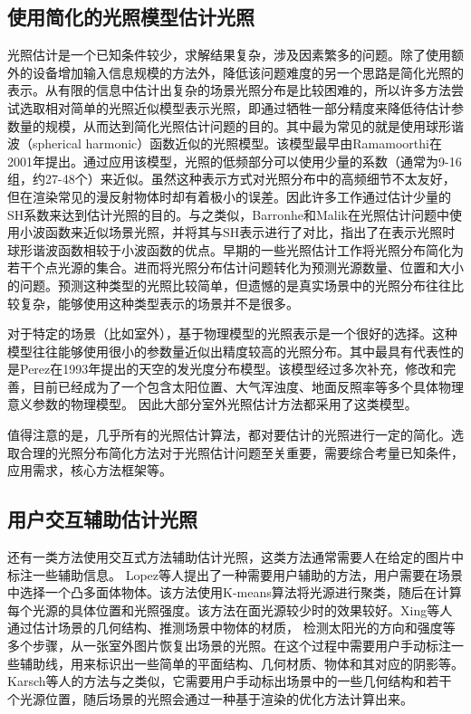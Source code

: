 \subsection{使用简化的光照模型估计光照}
光照估计是一个已知条件较少，求解结果复杂，涉及因素繁多的问题。除了使用额外的设备增加输入信息规模的方法外，降低该问题难度的另一个思路是简化光照的表示。从有限的信息中估计出复杂的场景光照分布是比较困难的，所以许多方法尝试选取相对简单的光照近似模型表示光照，即通过牺牲一部分精度来降低待估计参数量的规模，从而达到简化光照估计问题的目的。其中最为常见的就是使用球形谐波（spherical harmonic）函数近似的光照模型。该模型最早由Ramamoorthi\cite{ramamoorthi2001efficient}在2001年提出。通过应用该模型，光照的低频部分可以使用少量的系数（通常为9-16组，约27-48个）来近似。虽然这种表示方式对光照分布中的高频细节不太友好，但在渲染常见的漫反射物体时却有着极小的误差。因此许多工作\cite{ramamoorthi2001signal,kemelmacher20113d,garrido2013reconstructing,knorr2014real,li2014intrinsic,barron2015shape, rematas2016deep}通过估计少量的SH系数来达到估计光照的目的。与之类似，Barronhe和Malik\cite{okabe2004spherical}在光照估计问题中使用小波函数来近似场景光照，并将其与SH表示进行了对比，指出了在表示光照时球形谐波函数相较于小波函数的优点。早期的一些光照估计工作\cite{sato1999acquiring,  panagopoulos2011illumination, wang2002estimation, li2003multiple, sato2003illumination}将光照分布简化为若干个点光源的集合。进而将光照分布估计问题转化为预测光源数量、位置和大小的问题。预测这种类型的光照比较简单，但遗憾的是真实场景中的光照分布往往比较复杂，能够使用这种类型表示的场景并不是很多。

对于特定的场景（比如室外），基于物理模型的光照表示是一个很好的选择。这种模型往往能够使用很小的参数量近似出精度较高的光照分布。其中最具有代表性的是Perez\cite{perez1993all}在1993年提出的天空的发光度分布模型。该模型经过多次补充，修改和完善\cite{nishita1996display, sirai1993display,preetham1999practical,raab2008unbiased,hosek2012analytic, hovsekhovsek2013adding}，目前已经成为了一个包含太阳位置、大气浑浊度、地面反照率等多个具体物理意义参数的物理模型。
因此大部分室外光照估计方法\cite{lalonde2008does, lalonde2010sun, lalonde2012estimating, sunkavalli2008color}都采用了这类模型。

值得注意的是，几乎所有的光照估计算法，都对要估计的光照进行一定的简化。选取合理的光照分布简化方法对于光照估计问题至关重要，需要综合考量已知条件，应用需求，核心方法框架等。

\subsection{用户交互辅助估计光照}
还有一类方法使用交互式方法辅助估计光照，这类方法通常需要人在给定的图片中标注一些辅助信息。
Lopez等人\cite{lopez2010compositing}提出了一种需要用户辅助的方法，用户需要在场景中选择一个凸多面体物体。该方法使用K-means算法将光源进行聚类，随后在计算每个光源的具体位置和光照强度。该方法在面光源较少时的效果较好。Xing等人\cite{xing2013lighting}通过估计场景的几何结构、推测场景中物体的材质， 检测太阳光的方向和强度等多个步骤，从一张室外图片恢复出场景的光照。在这个过程中需要用户手动标注一些辅助线，用来标识出一些简单的平面结构、几何材质、物体和其对应的阴影等。Karsch等人\cite{karsch2011rendering}的方法与之类似，它需要用户手动标出场景中的一些几何结构和若干个光源位置，随后场景的光照会通过一种基于渲染的优化方法计算出来。

